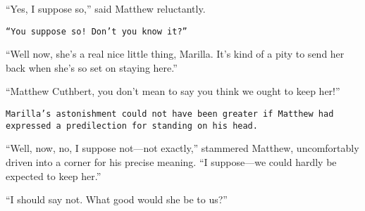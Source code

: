 \documentclass[a4paper]{article}
\begin{document}
``Yes, I suppose so,'' said Matthew reluctantly.

\texttt{``You suppose so! \rmfamily Don't you know it?''}

``Well now, she's a real nice little thing, Marilla. It's kind of a pity to send her back when she's so set on staying here.''

``Matthew Cuthbert, you don't mean to say you think we ought to keep her!''

\texttt{Marilla's astonishment could not have been greater if \sffamily  Matthew had expressed a predilection for standing on his head.}

``Well, now, no, I suppose not---not exactly,'' stammered Matthew, uncomfortably driven into a corner for his precise meaning. ``I suppose---we could hardly be expected to keep her.''

``I should say not. What good would she be to us?''
\end{document}
